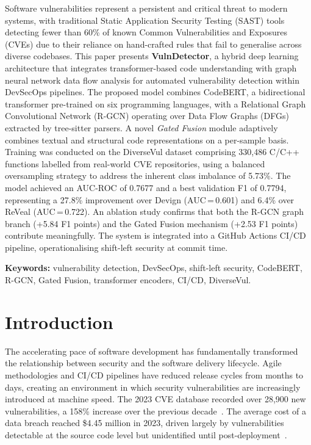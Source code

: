 \documentclass[12pt, letterpaper]{article}
\begin{document}
Software vulnerabilities represent a persistent and critical threat to modern
systems, with traditional Static Application Security Testing (SAST) tools
detecting fewer than 60\% of known Common Vulnerabilities and Exposures (CVEs)
due to their reliance on hand-crafted rules that fail to generalise across
diverse codebases. This paper presents \textbf{VulnDetector}, a hybrid deep
learning architecture that integrates transformer-based code understanding with
graph neural network data flow analysis for automated vulnerability detection
within DevSecOps pipelines. The proposed model combines CodeBERT, a
bidirectional transformer pre-trained on six programming languages, with a
Relational Graph Convolutional Network (R-GCN) operating over Data Flow Graphs
(DFGs) extracted by tree-sitter parsers. A novel \emph{Gated Fusion} module
adaptively combines textual and structural code representations on a per-sample
basis. Training was conducted on the DiverseVul dataset comprising 330,486
C/C++ functions labelled from real-world CVE repositories, using a balanced
oversampling strategy to address the inherent class imbalance of 5.73\%. The
model achieved an AUC-ROC of 0.7677 and a best validation F1 of 0.7794,
representing a 27.8\% improvement over Devign (AUC\,=\,0.601) and 6.4\% over
ReVeal (AUC\,=\,0.722). An ablation study confirms that both the R-GCN graph
branch (+5.84 F1 points) and the Gated Fusion mechanism (+2.53 F1 points)
contribute meaningfully. The system is integrated into a GitHub Actions CI/CD
pipeline, operationalising shift-left security at commit time.

\medskip\noindent
\textbf{Keywords:} vulnerability detection, DevSecOps, shift-left security,
CodeBERT, R-GCN, Gated Fusion, transformer encoders, CI/CD, DiverseVul.
\newpage

\section{Introduction}

The accelerating pace of software development has fundamentally transformed the
relationship between security and the software delivery lifecycle. Agile
methodologies and CI/CD pipelines have reduced release cycles from months to
days, creating an environment in which security vulnerabilities are increasingly
introduced at machine speed. The 2023 CVE database recorded over 28,900 new
vulnerabilities, a 158\% increase over the previous
decade~\citep{nist2023}. The average cost of a data breach reached \$4.45
million in 2023, driven largely by vulnerabilities detectable at the source
code level but unidentified until post-deployment~\citep{ibm2023}.
\end{document}
